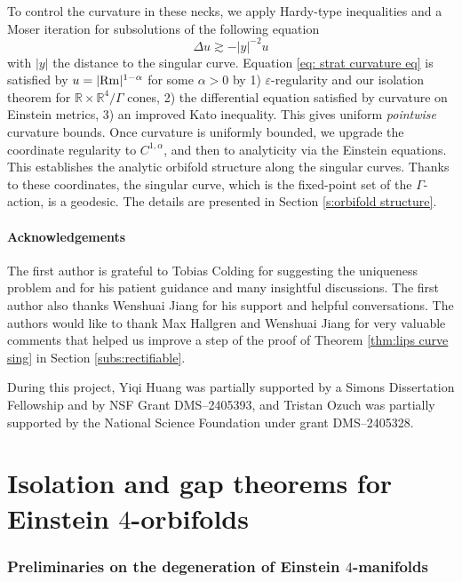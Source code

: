 \documentclass[11pt,reqno]{amsart}
\numberwithin{equation}{section}
\newcommand{\Rm}{{\rm Rm}}
\theoremstyle{definition}
\theoremstyle{remark}
\begin{document}
To control the curvature in these necks, we apply Hardy-type inequalities and a Moser iteration for subsolutions of the following equation
\begin{equation}\label{eq: strat curvature eq}
    \Delta u \gtrsim -|y|^{-2}u
\end{equation}
with $|y|$ the distance to the singular curve. Equation \eqref{eq: strat curvature eq} is satisfied by $u=|\Rm|^{1-\alpha}$ for some $\alpha>0$ by 1) $\varepsilon$-regularity and our isolation theorem for $\mathbb{R}\times\mathbb{R}^4/\Gamma$ cones, 2) the differential equation satisfied by curvature on Einstein metrics, 3) an improved Kato inequality. This gives uniform \emph{pointwise} curvature bounds. Once curvature is uniformly bounded, we upgrade the coordinate regularity to $C^{1,\alpha}$, and then to analyticity via the Einstein equations.  
This establishes the analytic orbifold structure along the singular curves. Thanks to these coordinates, the singular curve, which is the fixed-point set of the $\Gamma$-action, is a geodesic. The details are presented in Section \ref{s:orbifold structure}.



\subsection{Acknowledgements}

The first author is grateful to Tobias Colding for suggesting the uniqueness problem and for his patient guidance and many insightful discussions. The first author also thanks Wenshuai Jiang for his support and helpful conversations. The authors would like to thank Max Hallgren and Wenshuai Jiang for very valuable comments that helped us improve a step of the proof of Theorem \ref{thm:lips curve sing} in Section \ref{subs:rectifiable}.

During this project, Yiqi Huang was partially supported by a Simons Dissertation Fellowship and by NSF Grant DMS--2405393, and Tristan Ozuch was partially supported by the National Science Foundation under grant DMS--2405328.



\part{Isolation and gap theorems for Einstein $4$-orbifolds}


\section{Preliminaries on the degeneration of Einstein $4$-manifolds}
\end{document}
